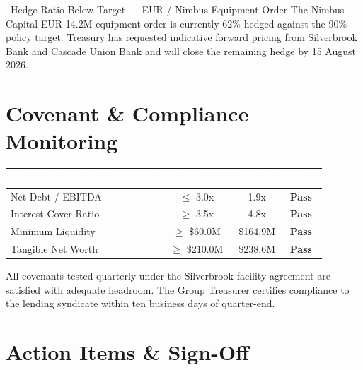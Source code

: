 \documentclass[11pt,a4paper]{scrreprt}
\begin{document}
\begin{riskbox}{\faLock\ Hedge Ratio Below Target --- EUR / Nimbus Equipment Order}
The Nimbus Capital EUR 14.2M equipment order is currently 62\% hedged against the 90\%
policy target. Treasury has requested indicative forward pricing from Silverbrook Bank
and Cascade Union Bank and will close the remaining hedge by 15 August 2026.
\end{riskbox}

\section{Covenant \& Compliance Monitoring}

\begin{table}[h!]
\centering
\small
\begin{tabularx}{\textwidth}{@{}Xccc@{}}
\toprule
\rowcolor{treasurynavy}
\textcolor{white}{\bfseries Covenant (Silverbrook RCF)} & \textcolor{white}{\bfseries Requirement} &
\textcolor{white}{\bfseries Actual} & \textcolor{white}{\bfseries Status} \\
\midrule
Net Debt / EBITDA        & $\leq$ 3.0x & 1.9x & \textcolor{treasuryteal}{\bfseries Pass} \\
\rowcolor{treasurygray}
Interest Cover Ratio     & $\geq$ 3.5x & 4.8x & \textcolor{treasuryteal}{\bfseries Pass} \\
Minimum Liquidity        & $\geq$ \$60.0M & \$164.9M & \textcolor{treasuryteal}{\bfseries Pass} \\
\rowcolor{treasurygray}
Tangible Net Worth       & $\geq$ \$210.0M & \$238.6M & \textcolor{treasuryteal}{\bfseries Pass} \\
\bottomrule
\end{tabularx}
\end{table}

\noindent All covenants tested quarterly under the Silverbrook facility agreement are
satisfied with adequate headroom. The Group Treasurer certifies compliance to the lending
syndicate within ten business days of quarter-end.

\section{Action Items \& Sign-Off}
\end{document}
